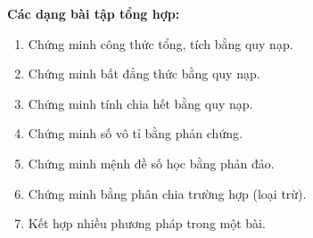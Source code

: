 \documentclass[12pt,a4paper]{article}
\begin{document}
\medskip\noindent\textbf{Các dạng bài tập tổng hợp:}
\begin{enumerate}[label=\textbf{Dạng \arabic*:}, leftmargin=*, align=left]
  \item Chứng minh công thức tổng, tích bằng quy nạp.
  \item Chứng minh bất đẳng thức bằng quy nạp.
  \item Chứng minh tính chia hết bằng quy nạp.
  \item Chứng minh số vô tỉ bằng phản chứng.
  \item Chứng minh mệnh đề số học bằng phản đảo.
  \item Chứng minh bằng phân chia trường hợp (loại trừ).
  \item Kết hợp nhiều phương pháp trong một bài.
\end{enumerate}
\end{document}

